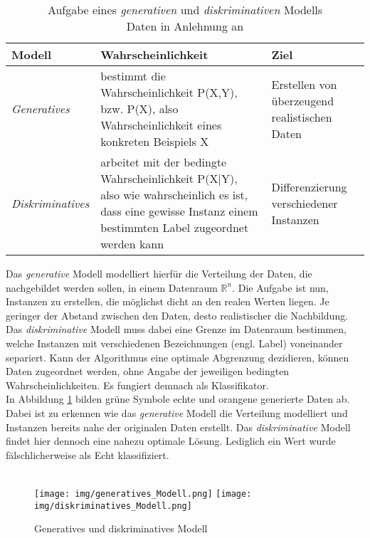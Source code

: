 \begin{table}[h]
\centering

	\begin{tabular}[h]{p{2.8cm}|p{7.5cm}|p{4.5cm}}
		Modell & Wahrscheinlichkeit & Ziel 
		\rule{0pt}{1.5em}\\
		\hline
		\rule{0pt}{1.5em}
		\textit{Generatives} & bestimmt die Wahrscheinlichkeit P(X,Y), bzw. P(X), also Wahrscheinlichkeit eines konkreten Beispiels X & Erstellen von überzeugend realistischen Daten\\
		\hline
		\rule{0pt}{1.5em}
		\textit{Diskriminatives} & arbeitet mit der bedingte Wahrscheinlichkeit P(X|Y), also wie wahrscheinlich es ist, dass eine gewisse Instanz einem bestimmten Label zugeordnet werden kann & Differenzierung verschiedener Instanzen\\
	\end{tabular}
	\captionsetup{justification=centering}
	\caption{Aufgabe eines \textit{generativen} und \textit{diskriminativen} Modells \\ Daten in Anlehnung an \cite[vgl.][]{30}}
	\label{tab:gen_dis_Modell}
\end{table}

Das \textit{generative} Modell modelliert hierfür die Verteilung der Daten, die nachgebildet werden sollen, in einem Datenraum $\mathbb{R}^n$. Die Aufgabe ist nun, Instanzen zu erstellen, die möglichst dicht an den realen Werten liegen. Je geringer der Abstand zwischen den Daten, desto realistischer die Nachbildung.
Das \textit{diskriminative} Modell muss dabei eine Grenze im Datenraum bestimmen, welche Instanzen mit verschiedenen Bezeichnungen (engl. Label) voneinander separiert. Kann der Algorithmus eine optimale Abgrenzung dezidieren, können Daten zugeordnet werden, ohne Angabe der jeweiligen bedingten Wahrscheinlichkeiten. Es fungiert demnach als Klassifikator.\\

In Abbildung \ref{fig:gen_dis_Modell} bilden grüne Symbole echte und orangene generierte Daten ab. Dabei ist zu erkennen wie das \textit{generative} Modell die Verteilung modelliert und Instanzen bereits nahe der originalen Daten erstellt. Das \textit{diskriminative} Modell findet hier dennoch eine nahezu optimale Lösung. Lediglich ein Wert wurde fälschlicherweise als Echt klassifiziert.

\begin{figure}[H]
	\centering
	\begin{center}	
		\\
		\vspace{0.5cm}
		\texttt{[image: img/generatives\_Modell.png]}
		\hspace{3cm}
		\texttt{[image: img/diskriminatives\_Modell.png]}
	\end{center}
	\caption{Generatives und diskriminatives Modell}
	\label{fig:gen_dis_Modell}
\end{figure}

